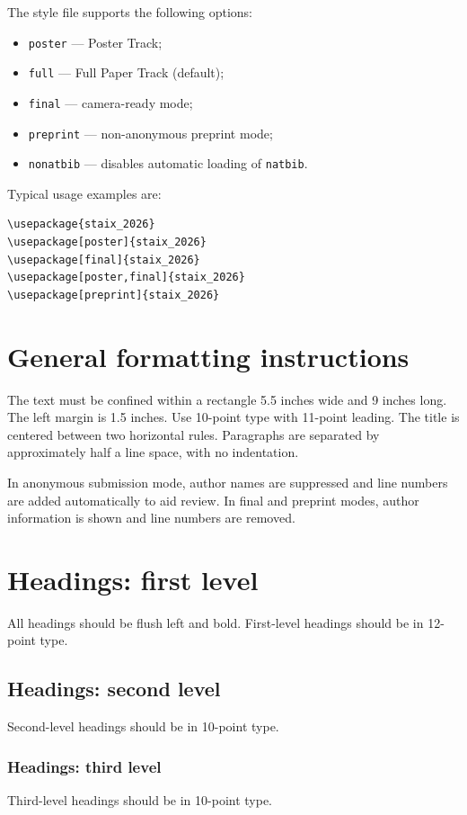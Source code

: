 \documentclass{article}
\begin{document}
The style file supports the following options:
\begin{itemize}
    \item \verb|poster| --- Poster Track;
    \item \verb|full| --- Full Paper Track (default);
    \item \verb|final| --- camera-ready mode;
    \item \verb|preprint| --- non-anonymous preprint mode;
    \item \verb|nonatbib| --- disables automatic loading of \verb|natbib|.
\end{itemize}

Typical usage examples are:
\begin{verbatim}
\usepackage{staix_2026}
\usepackage[poster]{staix_2026}
\usepackage[final]{staix_2026}
\usepackage[poster,final]{staix_2026}
\usepackage[preprint]{staix_2026}
\end{verbatim}

\section{General formatting instructions}
\label{gen_inst}
The text must be confined within a rectangle 5.5 inches wide and 9 inches long. The left margin is 1.5 inches. Use 10-point type with 11-point leading. The title is centered between two horizontal rules. Paragraphs are separated by approximately half a line space, with no indentation.

In anonymous submission mode, author names are suppressed and line numbers are added automatically to aid review. In final and preprint modes, author information is shown and line numbers are removed.

\section{Headings: first level}
\label{headings}
All headings should be flush left and bold. First-level headings should be in 12-point type.

\subsection{Headings: second level}
Second-level headings should be in 10-point type.

\subsubsection{Headings: third level}
Third-level headings should be in 10-point type.
\end{document}
